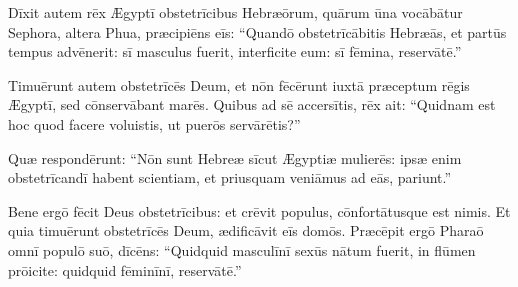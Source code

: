 Dīxit autem rēx Ægyptī  obstetrīcibus Hebræōrum, quārum ūna vocābātur Sephora, altera Phua, 
 præcipiēns eīs: ``Quandō obstetrīcābitis Hebræās, et  partūs tempus advēnerit: sī masculus fuerit, interficite eum: sī fēmina, reservātē.''

Timuērunt autem obstetrīcēs Deum, et nōn fēcērunt iuxtā præceptum rēgis Ægyptī, sed cōnservābant marēs. 
Quibus ad sē accersītis, rēx ait: ``Quidnam est hoc quod facere voluistis, ut puerōs servārētis?''

Quæ respondērunt: ``Nōn sunt Hebreæ sīcut Ægyptiæ mulierēs: ipsæ enim obstetrīcandī habent scientiam, et priusquam veniāmus ad eās, pariunt.''

Bene ergō fēcit Deus obstetrīcibus: et crēvit populus, cōnfortātusque est nimis.
Et quia timuērunt obstetrīcēs Deum, ædificāvit eīs domōs.
Præcēpit ergō Pharaō omnī populō suō, dīcēns: ``Quidquid masculīnī sexūs nātum fuerit, in flūmen prōicite: quidquid fēminīnī, reservātē.''
